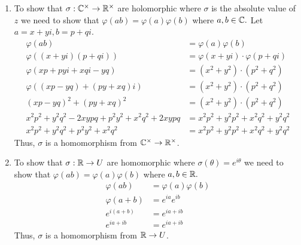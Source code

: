 \documentclass[12pt]{article}
\begin{document}
\begin{solution}
\begin{enumerate}
        \item To show that $\sigma : \mathbb C^\times \to \mathbb R^\times$ are holomorphic where $\sigma$ is the absolute value of $z$ we need to show that $\varphi(ab) = \varphi(a)\varphi(b)$ where $a, b \in \mathbb C.$ Let $a = x + yi, b  = p + qi$.
        \begin{align*}
            \varphi(ab) &= \varphi(a)\varphi(b) \\ 
            \varphi((x + yi) ( p + qi)) &= \varphi(x+yi) \cdot \varphi(p + qi) \\ 
            \varphi (xp + pyi + xqi -yq) &= (x^2 + y^2) \cdot (p^2 +q^2) \\
            \varphi ((xp-yq) + (py + xq)i) &= (x^2 + y^2) \cdot (p^2 +q^2) \\
            (xp-yq)^2 + (py + xq)^2 &= (x^2 + y^2) \cdot (p^2 +q^2)\\ 
            x^2p^2 + y^2q^2 -2xypq + p^2y^2 + x^2q^2 +2xypq &= x^2p^2 + y^2p^2 +x^2q^2 + y^2q^2 \\
            x^2p^2 + y^2q^2 + p^2y^2 + x^2q^2 &= x^2p^2 + y^2p^2 +x^2q^2 + y^2q^2
        \end{align*}
        Thus, $\sigma$ is a homomorphism from $\mathbb C^\times \to \mathbb R^\times$. 

        \item To show that $\sigma : \mathbb R \to U$ are homomorphic where $\sigma(\theta) = e^{i\theta}$  we need to show that $\varphi(ab) = \varphi(a)\varphi(b)$ where $a, b \in \mathbb R.$
        \begin{align*}
            \varphi(ab) &= \varphi(a)\varphi(b) \\ 
            \varphi(a+b) &= e^{ia}e^{ib} \\
            e^{i(a+b)} &= e^{ia+ib} \\
            e^{ia+ib} &= e^{ia+ib}
        \end{align*}
        Thus, $\sigma$ is a homomorphism from $\mathbb R \to U$. 

    \end{enumerate}
\end{solution}
\end{document}
